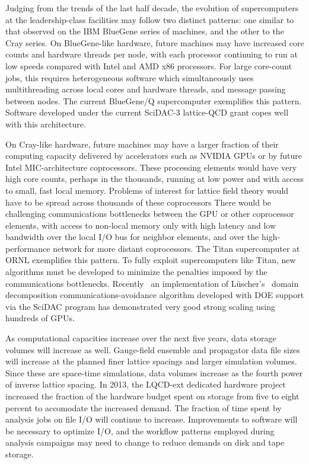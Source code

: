 Judging from the trends of the last half decade, the evolution of
supercomputers at the leadership-class facilities may follow two distinct
patterns: one similar to that observed on the IBM BlueGene series of machines,
and the other to the Cray series.  On BlueGene-like hardware, future machines
may have increased core counts and hardware threads per node, with each
processor continuing to run at low speeds compared with Intel and AMD x86
processors.  For large core-count jobs, this requires heterogeneous software
which simultaneously uses multithreading across local cores and hardware
threads, and message passing between nodes.    The current BlueGene/Q
supercomputer exemplifies this pattern.  Software developed under the
current SciDAC-3 lattice-QCD grant copes well with this architecture.

On Cray-like hardware, future machines may have a larger fraction of their
computing capacity delivered by accelerators such as NVIDIA GPUs or by
future Intel MIC-architecture coprocessors.  These processing elements would
have very high core counts, perhaps in the thousands, running at low power and
with access to small, fast local memory.  Problems of interest for lattice
field theory would have to be spread across thousands of these coprocessors
There would be challenging communications bottlenecks between the GPU or
other coprocessor elements, with access to non-local memory only with high
latency and low bandwidth over the local I/O bus for neighbor elements, and
over the high-performance network for more distant coprocessors.  The Titan
supercomputer at ORNL exemplifies this pattern.  To fully exploit
supercomputers like Titan, new algorithms must be developed to minimize the
penalties imposed by the communications bottlenecks.  Recently~\cite{QUDAdd}
an implementation of L\"{u}scher's~\cite{DomainDecomp} domain decomposition
communications-avoidance algorithm developed with DOE support via the SciDAC
program has demonstrated very good strong scaling using hundreds of GPUs.

As computational capacities increase over the next five years, data storage
volumes will increase as well.  Gauge-field ensemble and propagator data file
sizes will increase at the planned finer lattice spacings and larger
simulation volumes.  Since these are space-time simulations, data volumes
increase as the fourth power of inverse lattice spacing.  In 2013, the
LQCD-ext dedicated hardware project increased the fraction of the hardware
budget spent on storage from five to eight percent to accomodate the increased
demand.  The fraction of time spent by analysis jobs on file I/O will continue
to increase.  Improvements to software will be necessary to optimize I/O, and
the workflow patterns employed during analysis campaigns may need to change to
reduce demands on disk and tape storage.

